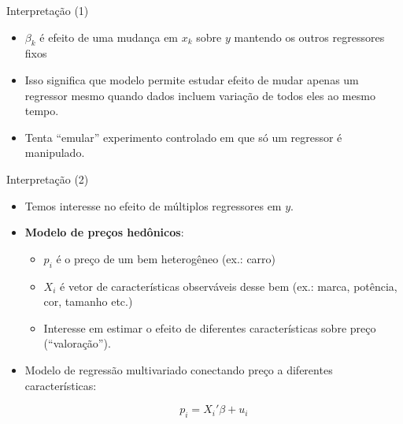 \documentclass[10pt,slides,xcolor=pdftex,dvipsnames,table]{beamer}
\begin{document}

\begin{frame}{Interpretação (1)}

\begin{itemize}\itemsep1.2em 
	
	\item $\beta_k$ é efeito de uma mudança em $x_k$ sobre $y$ mantendo os outros regressores fixos
	
	\item Isso significa que modelo permite estudar efeito de mudar apenas um regressor mesmo quando dados incluem variação de todos eles ao mesmo tempo. 
	
	\item Tenta ``emular'' experimento controlado em que só um regressor é manipulado. 
        
\end{itemize}

\end{frame}


\begin{frame}{Interpretação (2)}

\begin{itemize}\itemsep1.2em 
	
	\item Temos interesse no efeito de múltiplos regressores em $y$.
	
	\item \textbf{Modelo de preços hedônicos}:
	
	\begin{itemize}
		\item $p_i$ é o preço de um bem heterogêneo (ex.: carro) 
	
	\item $X_i$ é vetor de características observáveis desse bem (ex.: marca, potência, cor, tamanho etc.)
	
	\item Interesse em estimar o efeito de diferentes características sobre preço (``valoração''). 
		
	\end{itemize}
	
	\item Modelo de regressão multivariado conectando preço a diferentes características:
	
	$$ p_i = X_i' \beta + u_i $$ 
        
\end{itemize}

\end{frame}
\end{document}
